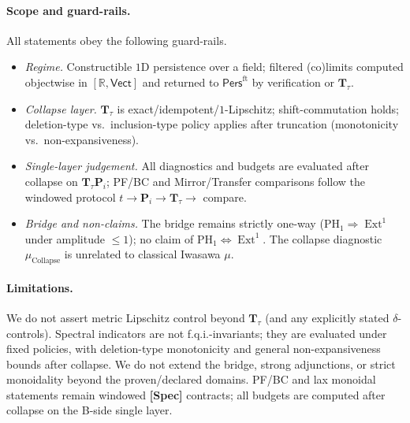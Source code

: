\documentclass[11pt]{article}
\numberwithin{equation}{section}
\theoremstyle{plain}
\theoremstyle{definition}
\theoremstyle{remark}
\DeclareMathOperator{\Ext}{Ext}
\newcommand{\Pers}{\mathsf{Pers}}
\theoremstyle{plain}
\theoremstyle{definition}
\numberwithin{equation}{section}
\theoremstyle{definition}
\numberwithin{equation}{section}
\theoremstyle{plain}
\theoremstyle{definition}
\theoremstyle{remark}
\begin{document}
\paragraph{Scope and guard-rails.}
All statements obey the following guard-rails.
\begin{itemize}
  \item \emph{Regime.} Constructible \(1\)D persistence over a field; filtered (co)limits computed objectwise in \([\mathbb{R},\mathsf{Vect}]\) and returned to \(\Pers^{\mathrm{ft}}\) by verification or \(\mathbf{T}_\tau\).
  \item \emph{Collapse layer.} \(\mathbf{T}_\tau\) is exact/idempotent/\(1\)-Lipschitz; shift-commutation holds; deletion-type vs.\ inclusion-type policy applies after truncation (monotonicity vs.\ non-expansiveness).
  \item \emph{Single-layer judgement.} All diagnostics and budgets are evaluated after collapse on \(\mathbf{T}_\tau \mathbf{P}_i\); PF/BC and Mirror/Transfer comparisons follow the windowed protocol \(t\to \mathbf{P}_i\to \mathbf{T}_\tau\to\) compare.
  \item \emph{Bridge and non-claims.} The bridge remains strictly one-way (\(\mathrm{PH}_1\Rightarrow\Ext^1\) under amplitude \(\le 1\)); no claim of \(\mathrm{PH}_1\Leftrightarrow \Ext^1\). The collapse diagnostic \(\mu_{\mathrm{Collapse}}\) is unrelated to classical Iwasawa \(\mu\).
\end{itemize}

\paragraph{Limitations.}
We do not assert metric Lipschitz control beyond \(\mathbf{T}_\tau\) (and any explicitly stated \(\delta\)-controls). Spectral indicators are not f.q.i.-invariants; they are evaluated under fixed policies, with deletion-type monotonicity and general non-expansiveness bounds after collapse. We do not extend the bridge, strong adjunctions, or strict monoidality beyond the proven/declared domains. PF/BC and lax monoidal statements remain windowed \textbf{[Spec]} contracts; all budgets are computed after collapse on the B-side single layer.
\end{document}
